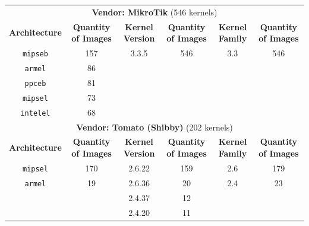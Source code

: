 \begin{table}[h]
{\begin{tabular}{cccccc}
\multicolumn{6}{c}{\textbf{Vendor: MikroTik} (546 kernels)}                                                                    \\
\textbf{Architecture}  &  \multicolumn{1}{c|}{\textbf{Quantity of Images}} & \textbf{Kernel Version} & \multicolumn{1}{c|}{\textbf{Quantity of Images}} & \textbf{Kernel Family} & \textbf{Quantity of Images} \\ \hline
{\tt mipseb}            & \multicolumn{1}{c|}{157}                & 3.3.5                  & \multicolumn{1}{c|}{546}                           & 3.3                     & 546                       \\
{\tt armel}             & \multicolumn{1}{c|}{86}                 &                        & \multicolumn{1}{c|}{}                              &                         &                           \\
{\tt ppceb}             & \multicolumn{1}{c|}{81}                 &                        & \multicolumn{1}{c|}{}                              &                         &                           \\ 
{\tt mipsel}            & \multicolumn{1}{c|}{73}                 &                        & \multicolumn{1}{c|}{}                              &                         &                           \\ 
{\tt intelel}           & \multicolumn{1}{c|}{68}                 &                        & \multicolumn{1}{c|}{}                              &                         &                           \\ \hline

\multicolumn{6}{c}{\textbf{Vendor: Tomato (Shibby)} (202 kernels)}                                                                    \\
\textbf{Architecture} & \multicolumn{1}{c|}{\textbf{Quantity of Images}} & \textbf{Kernel Version} & \multicolumn{1}{c|}{\textbf{Quantity of Images}} & \textbf{Kernel Family} & \textbf{Quantity of Images} \\ \hline
{\tt mipsel}            & \multicolumn{1}{c|}{170}               & 2.6.22                  & \multicolumn{1}{c|}{159}                         & 2.6                     & 179                        \\
{\tt armel}             & \multicolumn{1}{c|}{19}                & 2.6.36                  & \multicolumn{1}{c|}{20}                          & 2.4                     & 23                         \\
                        & \multicolumn{1}{c|}{}                  & 2.4.37                  & \multicolumn{1}{c|}{12}                          &                         &                            \\
                        & \multicolumn{1}{c|}{}                  & 2.4.20                  & \multicolumn{1}{c|}{11}                          &                         &                            \\ \hline


\end{tabular}}
\end{table}
